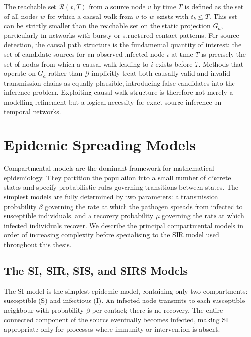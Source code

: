 The reachable set $\mathcal{R}(v, T)$ from a source node $v$ by time $T$ is defined as the set of all nodes $w$ for which a causal walk from $v$ to $w$ exists with $t_k \leq T$. This set can be strictly smaller than the reachable set on the static projection $G_a$, particularly in networks with bursty or structured contact patterns. For source detection, the causal path structure is the fundamental quantity of interest: the set of candidate sources for an observed infected node $i$ at time $T$ is precisely the set of nodes from which a causal walk leading to $i$ exists before $T$. Methods that operate on $G_a$ rather than $\mathcal{G}$ implicitly treat both causally valid and invalid transmission chains as equally plausible, introducing false candidates into the inference problem. Exploiting causal walk structure is therefore not merely a modelling refinement but a logical necessity for exact source inference on temporal networks.

\section{Epidemic Spreading Models}
\label{st:section2}

Compartmental models are the dominant framework for mathematical epidemiology. They partition the population into a small number of discrete states and specify probabilistic rules governing transitions between states. The simplest models are fully determined by two parameters: a transmission probability $\beta$ governing the rate at which the pathogen spreads from infected to susceptible individuals, and a recovery probability $\mu$ governing the rate at which infected individuals recover. We describe the principal compartmental models in order of increasing complexity before specialising to the SIR model used throughout this thesis.

\subsection{The SI, SIR, SIS, and SIRS Models}

The SI model is the simplest epidemic model, containing only two compartments: susceptible (S) and infectious (I). An infected node transmits to each susceptible neighbour with probability $\beta$ per contact; there is no recovery. The entire connected component of the source eventually becomes infected, making SI appropriate only for processes where immunity or intervention is absent.

